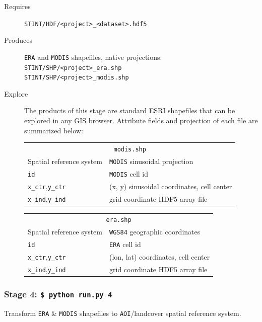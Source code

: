 \documentclass[twoside,a4paper]{refart}
\begin{document}
  \begin{description}
    \item [Requires]
          \texttt{STINT/HDF/<project>\_<dataset>.hdf5}
  
  
    \item [Produces]
      \texttt{ERA} and \texttt{MODIS} shapefiles, native projections:\\
      \texttt{STINT/SHP/<project>\_era.shp} \\
      \texttt{STINT/SHP/<project>\_modis.shp} 
      

    \item [Explore]
      The products of this stage are standard ESRI shapefiles that can be explored in any GIS browser.  Attribute fields and projection of each file are summarized below:
      
\begin{tabular}{ll}
       \multicolumn{2}{c}{\texttt{modis.shp}} \\
Spatial reference system        & \texttt{MODIS} sinusoidal projection \\
\texttt{id}                     & \texttt{MODIS} cell id \\  
\texttt{x\_ctr},\texttt{y\_ctr} &  (x, y) sinusoidal coordinates, cell center\\
\texttt{x\_ind},\texttt{y\_ind} & grid coordinate HDF5 array file\\
\end{tabular}
      
\begin{tabular}{ll}
       \multicolumn{2}{c}{ \texttt{era.shp}} \\
Spatial reference system        & \texttt{WGS84} geographic coordinates \\
\texttt{id}                     & \texttt{ERA} cell id\\
\texttt{x\_ctr},\texttt{y\_ctr} & (lon, lat) coordinates, cell center \\ 
\texttt{x\_ind},\texttt{y\_ind} & grid coordinate HDF5 array file\\
\end{tabular}

  \end{description}


\subsubsection{\textbf{Stage 4:} \texttt{\$ python run.py 4}}
Transform \texttt{ERA} \& \texttt{MODIS} shapefiles to \texttt{AOI}/landcover spatial reference system.
        
\end{document}
